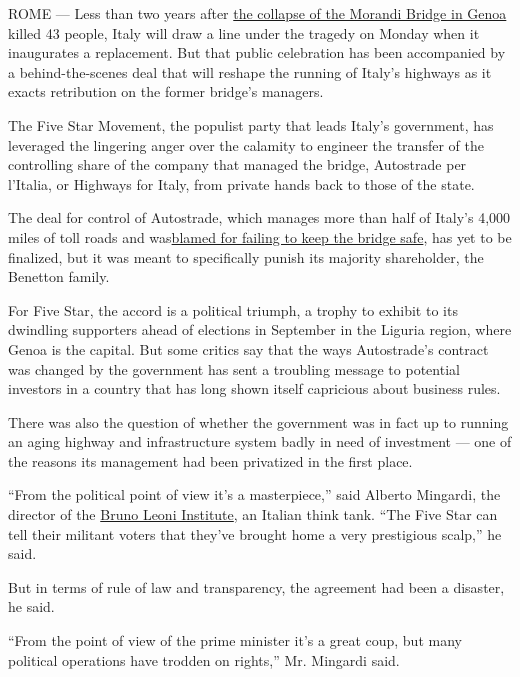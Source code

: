 ROME --- Less than two years after
\href{https://www.nytimes3xbfgragh.onion/interactive/2018/09/06/world/europe/genoa-italy-bridge.html\#:~:text=He\%20was\%20in\%20free\%20fall,tracks\%20and\%20gritty\%20streets\%20below.}{the
collapse of the Morandi Bridge in Genoa} killed 43 people, Italy will
draw a line under the tragedy on Monday when it inaugurates a
replacement. But that public celebration has been accompanied by a
behind-the-scenes deal that will reshape the running of Italy's highways
as it exacts retribution on the former bridge's managers.

The Five Star Movement, the populist party that leads Italy's
government, has leveraged the lingering anger over the calamity to
engineer the transfer of the controlling share of the company that
managed the bridge, Autostrade per l'Italia, or Highways for Italy, from
private hands back to those of the state.

The deal for control of Autostrade, which manages more than half of
Italy's 4,000 miles of toll roads and
was\href{https://www.nytimes3xbfgragh.onion/2018/08/15/world/europe/italy-genoa-bridge-collapse.html?searchResultPosition=42}{blamed
for failing to keep the bridge safe}, has yet to be finalized, but it
was meant to specifically punish its majority shareholder, the Benetton
family.

For Five Star, the accord is a political triumph, a trophy to exhibit to
its dwindling supporters ahead of elections in September in the Liguria
region, where Genoa is the capital. But some critics say that the ways
Autostrade's contract was changed by the government has sent a troubling
message to potential investors in a country that has long shown itself
capricious about business rules.

There was also the question of whether the government was in fact up to
running an aging highway and infrastructure system badly in need of
investment --- one of the reasons its management had been privatized in
the first place.

``From the political point of view it's a masterpiece,'' said Alberto
Mingardi, the director of the \href{http://www.brunoleoni.it/}{Bruno
Leoni Institute}, an Italian think tank. ``The Five Star can tell their
militant voters that they've brought home a very prestigious scalp,'' he
said.

But in terms of rule of law and transparency, the agreement had been a
disaster, he said.

``From the point of view of the prime minister it's a great coup, but
many political operations have trodden on rights,'' Mr. Mingardi said.

